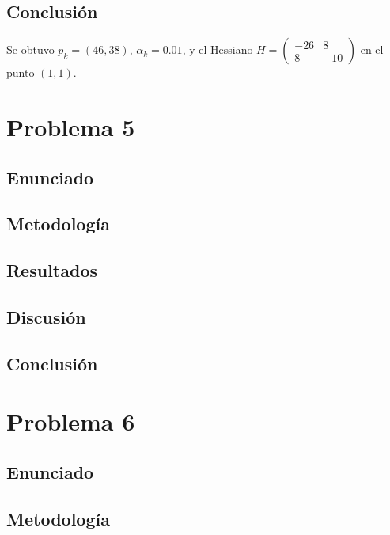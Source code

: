 \documentclass{article}
\begin{document}
\subsection{Conclusión}

Se obtuvo $p_k = (46, 38)$, $\alpha_k = 0.01$, y el Hessiano $H = \begin{pmatrix} -26 & 8 \\ 8 & -10 \end{pmatrix}$ en el punto $(1,1)$.

\section{Problema 5}

\subsection{Enunciado}

\subsection{Metodología}

\subsection{Resultados}
\setcounter{equation}{0}

\subsection{Discusión}

\subsection{Conclusión}

\section{Problema 6}

\subsection{Enunciado}

\subsection{Metodología}
\end{document}

